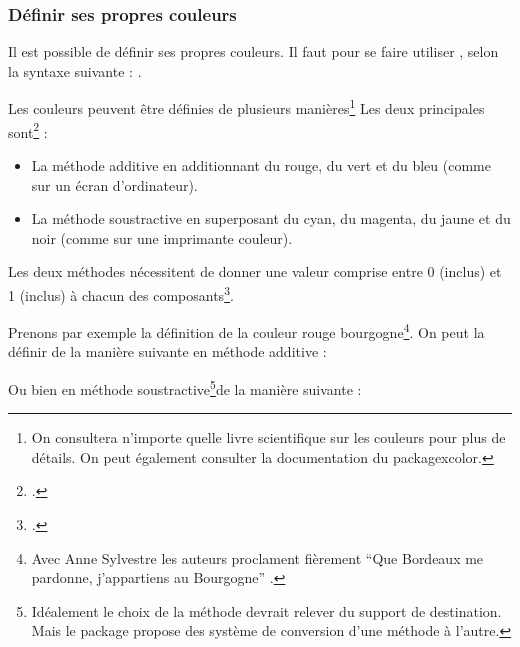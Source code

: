 \subsubsection{Définir ses propres couleurs}

Il est possible de définir ses propres couleurs. Il faut pour se faire utiliser , selon la syntaxe suivante : .


Les couleurs peuvent être définies de plusieurs manières\footnote{On consultera n'importe quelle livre scientifique sur les couleurs pour plus de détails. On peut également consulter la documentation du package{xcolor}.} Les deux principales sont\footcite[Il existe aussi la méthode de définition par la longueur d'onde pour les couleurs de l'arc en ciel, par pourcentage de gris pour les différents niveaux de gris, ainsi que par teinte, saturation et luminosité, mais ceci nécessiterait un cours de physique lumineuse. Pour  les personnes intéressées par les détails, consulter][]{xcolor_methode} :
\begin{itemize}
\item La méthode additive en additionnant du rouge, du vert et du bleu (comme sur un écran d'ordinateur).
\item La méthode soustractive en superposant du cyan, du magenta, du jaune et du noir (comme sur une imprimante couleur).
\end{itemize}


Les deux méthodes nécessitent de donner une valeur comprise entre 0 (inclus) et 1 (inclus) à chacun des composants\footcite[On pourra trouver une série de code couleur sur le site][]{codecouleur}.



Prenons par exemple la définition de la couleur \textcolor{rougebourgogne}{rouge bourgogne}\footnote{Avec Anne Sylvestre les auteurs proclament fièrement \enquote{Que Bordeaux me pardonne, j’appartiens au Bourgogne} \parencite{romaneconti}.}.
On peut la définir de la manière suivante en méthode additive :

\begin{latexcode}
\end{latexcode}

Ou bien en méthode soustractive\footnote{Idéalement le choix de  la méthode devrait relever du support de destination. Mais le package  propose des système de conversion d'une méthode à l'autre.}de la manière suivante :

